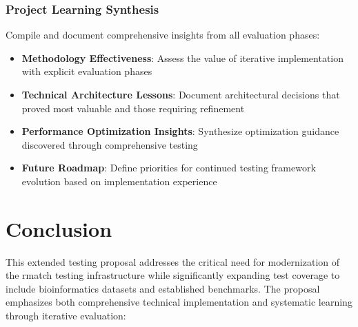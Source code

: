 \documentclass[11pt,a4paper]{article}
\begin{document}
\subsubsection{Project Learning Synthesis}
Compile and document comprehensive insights from all evaluation phases:
\begin{itemize}
    \item \textbf{Methodology Effectiveness}: Assess the value of iterative implementation with explicit evaluation phases
    \item \textbf{Technical Architecture Lessons}: Document architectural decisions that proved most valuable and those requiring refinement
    \item \textbf{Performance Optimization Insights}: Synthesize optimization guidance discovered through comprehensive testing
    \item \textbf{Future Roadmap}: Define priorities for continued testing framework evolution based on implementation experience
\end{itemize}


\newpage
\section{Conclusion}

This extended testing proposal addresses the critical need for modernization of the rmatch testing infrastructure while significantly expanding test coverage to include bioinformatics datasets and established benchmarks. The proposal emphasizes both comprehensive technical implementation and systematic learning through iterative evaluation:
\end{document}
